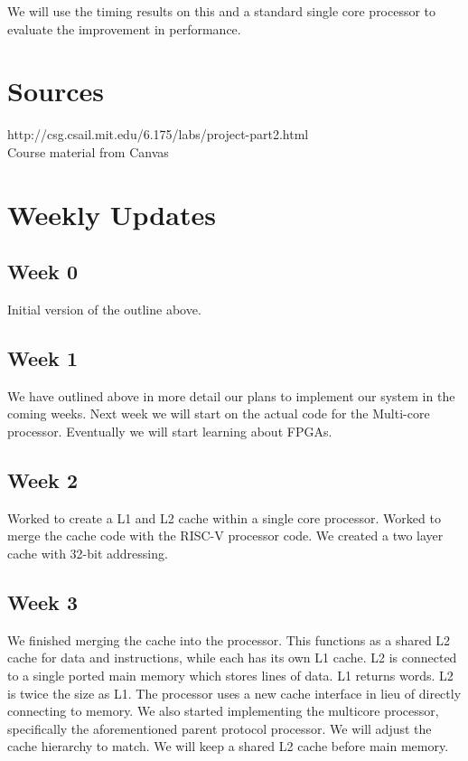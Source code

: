 \documentclass{article}
\begin{document}
We will use the timing results on this and a standard single core processor to evaluate the improvement in performance. 

\section{Sources}

http://csg.csail.mit.edu/6.175/labs/project-part2.html
\\
Course material from Canvas

\section{Weekly Updates}
\subsection{Week 0}
Initial version of the outline above.
\subsection{Week 1}
We have outlined above in more detail our plans to implement our system in the coming weeks. Next week we will start on the actual code for the Multi-core processor. Eventually we will start learning about FPGAs.
\subsection{Week 2}
Worked to create a L1 and L2 cache within a single core processor. Worked to merge the cache code with the RISC-V processor code. We created a two layer cache with 32-bit addressing.
\subsection{Week 3}
We finished merging the cache into the processor. This functions as a shared L2 cache for data and instructions, while each has its own L1 cache. L2 is connected to a single ported main memory which stores lines of data. L1 returns words. L2 is twice the size as L1. The processor uses a new cache interface in lieu of directly connecting to memory. We also started implementing the multicore processor, specifically the aforementioned parent protocol processor. We will adjust the cache hierarchy to match. We will keep a shared L2 cache before main memory. 
\end{document}

